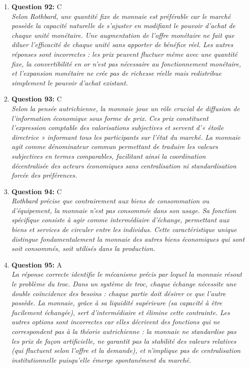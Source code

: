 \documentclass[12pt,a4paper]{article}
\begin{document}
\begin{enumerate}
\item \textbf{Question 92:} C
\\ \textit{Selon Rothbard, une quantité fixe de monnaie est préférable car le marché possède la capacité naturelle de s'ajuster en modifiant le pouvoir d'achat de chaque unité monétaire. Une augmentation de l'offre monétaire ne fait que diluer l'efficacité de chaque unité sans apporter de bénéfice réel. Les autres réponses sont incorrectes : les prix peuvent fluctuer même avec une quantité fixe, la convertibilité en or n'est pas nécessaire au fonctionnement monétaire, et l'expansion monétaire ne crée pas de richesse réelle mais redistribue simplement le pouvoir d'achat existant.}

\item \textbf{Question 93:} C
\\ \textit{Selon la pensée autrichienne, la monnaie joue un rôle crucial de diffusion de l'information économique sous forme de prix. Ces prix constituent l'expression comptable des valorisations subjectives et servent d'« étoile directrice » informant tous les participants sur l'état du marché. La monnaie agit comme dénominateur commun permettant de traduire les valeurs subjectives en termes comparables, facilitant ainsi la coordination décentralisée des acteurs économiques sans centralisation ni standardisation forcée des préférences.}

\item \textbf{Question 94:} C
\\ \textit{Rothbard précise que contrairement aux biens de consommation ou d'équipement, la monnaie n'est pas consommée dans son usage. Sa fonction spécifique consiste à agir comme intermédiaire d'échange, permettant aux biens et services de circuler entre les individus. Cette caractéristique unique distingue fondamentalement la monnaie des autres biens économiques qui sont soit consommés, soit utilisés dans la production.}

\item \textbf{Question 95:} A
\\ \textit{La réponse correcte identifie le mécanisme précis par lequel la monnaie résout le problème du troc. Dans un système de troc, chaque échange nécessite une double coïncidence des besoins : chaque partie doit désirer ce que l'autre possède. La monnaie, grâce à sa liquidité supérieure (sa capacité à être facilement échangée), sert d'intermédiaire et élimine cette contrainte. Les autres options sont incorrectes car elles décrivent des fonctions qui ne correspondent pas à la théorie autrichienne : la monnaie ne standardise pas les prix de façon artificielle, ne garantit pas la stabilité des valeurs relatives (qui fluctuent selon l'offre et la demande), et n'implique pas de centralisation institutionnelle puisqu'elle émerge spontanément du marché.}


\end{enumerate}
\end{document}
